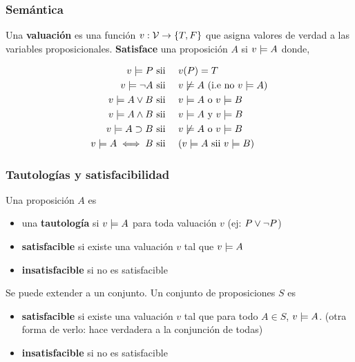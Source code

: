\documentclass{report}
\theoremstyle{definition} %
\newcommand{\tfunc}[2]{#1 \to #2}
\begin{document}
\subsubsection{Semántica}

Una \textbf{valuación} es una función $v: \tfunc{\propVars}{\{ T, F \}}$ que
asigna valores de verdad a las variables proposicionales. \textbf{Satisface} una
proposición $A$ si $v \models A$ donde,

\begin{alignat*}{2}
    v \models P & \text{ sii } && v(P) = T\\
    v \models \neg A & \text{ sii }&& v \not\models A \text{ (i.e no $v \models A$)}\\
    v \models A \vee B & \text{ sii }&& v \models A \text{ o } v \models B\\
    v \models A \wedge B & \text{ sii }&& v \models A \text{ y } v \models B\\
    v \models A \supset B &\text{ sii }&& v \not\models A \text{ o } v \models B\\
    v \models A \iff B & \text{ sii }&& (v \models A \text{ sii } v \models B)
\end{alignat*}

\subsubsection{Tautologías y satisfacibilidad}

Una proposición $A$ es

\begin{itemize}
    \item una \textbf{tautología} si $v \models A$ para toda valuación $v$ 
    (ej: $P \vee \neg P$)
    \item \textbf{satisfacible} si existe una valuación $v$ tal que $v \models A$
    \item \textbf{insatisfacible} si no es satisfacible
\end{itemize}

Se puede extender a un conjunto. Un conjunto de proposiciones $S$ es 

\begin{itemize}
    \item \textbf{satisfacible} si existe una valuación $v$ tal que para todo $A
    \in S$, $v \models A$. (otra forma de verlo: hace verdadera a la conjunción
    de todas)
    \item \textbf{insatisfacible} si no es satisfacible
\end{itemize}
\end{document}
